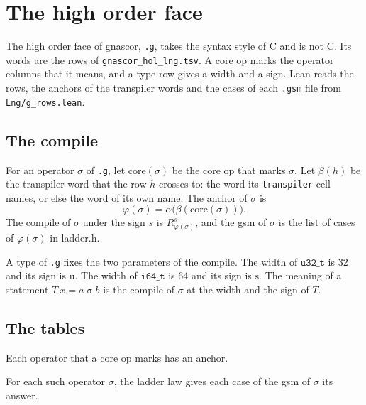 \chapter{The high order face}
\label{ch:g}

The high order face of gnascor, \texttt{.g}, takes the syntax style of C and is not C. Its words are the rows of
\texttt{gnascor\_hol\_lng.tsv}. A core op marks the operator columns that it means, and a type row gives a width
and a sign. Lean reads the rows, the anchors of the transpiler words and the cases of each \texttt{.gsm} file from
\texttt{Lng/g\_rows.lean}.

\section{The compile}

\begin{definition}
For an operator $\sigma$ of \texttt{.g}, let $\mathrm{core}(\sigma)$ be the core op that marks $\sigma$. Let
$\beta(h)$ be the transpiler word that the row $h$ crosses to: the word its \texttt{transpiler} cell names, or else
the word of its own name. The anchor of $\sigma$ is
\[
  \varphi(\sigma) = \alpha\bigl(\beta(\mathrm{core}(\sigma))\bigr).
\]
The compile of $\sigma$ under the sign $s$ is $R^{s}_{\varphi(\sigma)}$, and the gsm of $\sigma$ is the list of
cases of $\varphi(\sigma)$ in ladder.h.
\end{definition}

A type of \texttt{.g} fixes the two parameters of the compile. The width of $\texttt{u32\_t}$ is 32 and its
sign is $\mathrm{u}$. The width of $\texttt{i64\_t}$ is 64 and its sign is $\mathrm{s}$. The meaning of a
statement $T\ x = a \mathbin{\sigma} b$ is the compile of $\sigma$ at the width and the sign of $T$.

\section{The tables}

\begin{theorem}
Each operator that a core op marks has an anchor.
\end{theorem}

\begin{theorem}
For each such operator $\sigma$, the ladder law gives each case of the gsm of $\sigma$ its answer.
\end{theorem}

